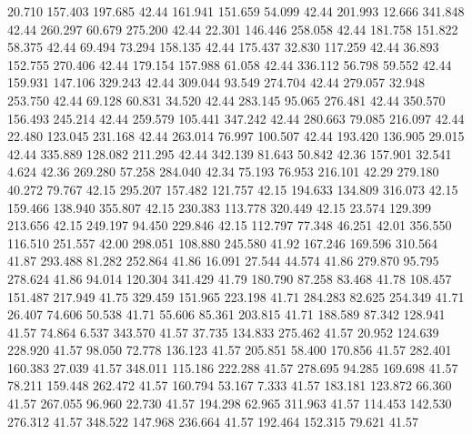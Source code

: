   20.710  157.403  197.685        42.44
 161.941  151.659   54.099        42.44
 201.993   12.666  341.848        42.44
 260.297   60.679  275.200        42.44
  22.301  146.446  258.058        42.44
 181.758  151.822   58.375        42.44
  69.494   73.294  158.135        42.44
 175.437   32.830  117.259        42.44
  36.893  152.755  270.406        42.44
 179.154  157.988   61.058        42.44
 336.112   56.798   59.552        42.44
 159.931  147.106  329.243        42.44
 309.044   93.549  274.704        42.44
 279.057   32.948  253.750        42.44
  69.128   60.831   34.520        42.44
 283.145   95.065  276.481        42.44
 350.570  156.493  245.214        42.44
 259.579  105.441  347.242        42.44
 280.663   79.085  216.097        42.44
  22.480  123.045  231.168        42.44
 263.014   76.997  100.507        42.44
 193.420  136.905   29.015        42.44
 335.889  128.082  211.295        42.44
 342.139   81.643   50.842        42.36
 157.901   32.541    4.624        42.36
 269.280   57.258  284.040        42.34
  75.193   76.953  216.101        42.29
 279.180   40.272   79.767        42.15
 295.207  157.482  121.757        42.15
 194.633  134.809  316.073        42.15
 159.466  138.940  355.807        42.15
 230.383  113.778  320.449        42.15
  23.574  129.399  213.656        42.15
 249.197   94.450  229.846        42.15
 112.797   77.348   46.251        42.01
 356.550  116.510  251.557        42.00
 298.051  108.880  245.580        41.92
 167.246  169.596  310.564        41.87
 293.488   81.282  252.864        41.86
  16.091   27.544   44.574        41.86
 279.870   95.795  278.624        41.86
  94.014  120.304  341.429        41.79
 180.790   87.258   83.468        41.78
 108.457  151.487  217.949        41.75
 329.459  151.965  223.198        41.71
 284.283   82.625  254.349        41.71
  26.407   74.606   50.538        41.71
  55.606   85.361  203.815        41.71
 188.589   87.342  128.941        41.57
  74.864    6.537  343.570        41.57
  37.735  134.833  275.462        41.57
  20.952  124.639  228.920        41.57
  98.050   72.778  136.123        41.57
 205.851   58.400  170.856        41.57
 282.401  160.383   27.039        41.57
 348.011  115.186  222.288        41.57
 278.695   94.285  169.698        41.57
  78.211  159.448  262.472        41.57
 160.794   53.167    7.333        41.57
 183.181  123.872   66.360        41.57
 267.055   96.960   22.730        41.57
 194.298   62.965  311.963        41.57
 114.453  142.530  276.312        41.57
 348.522  147.968  236.664        41.57
 192.464  152.315   79.621        41.57
